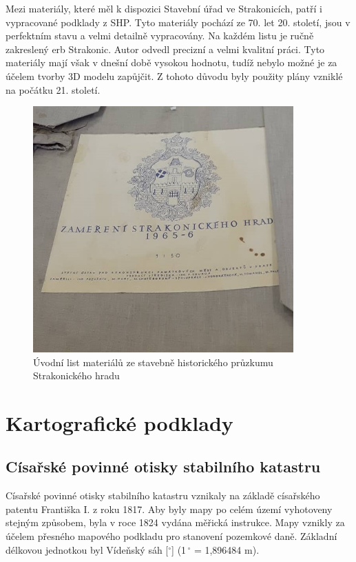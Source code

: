 \documentclass[thesis=M,czech]{FITthesis}[2012/06/26]
\begin{document}
Mezi materiály, které měl k dispozici Stavební úřad ve Strakonicích, patří i vypracované podklady z SHP. Tyto materiály pochází ze 70. let 20. století, jsou v perfektním stavu a velmi detailně vypracovány. Na každém listu je ručně zakreslený erb Strakonic. Autor odvedl precizní a velmi kvalitní práci. Tyto materiály mají však v dnešní době vysokou hodnotu, tudíž nebylo možné je za účelem tvorby 3D modelu zapůjčit. Z tohoto důvodu byly použity plány vzniklé na počátku 21. století. \cite{shp}

\clearpage

\begin{figure}[h!]
	\centering
	\includegraphics[width=10cm]{pics/shp.jpg}
	\caption{Úvodní list materiálů ze stavebně historického průzkumu Strakonického hradu}
	\label{obrazek:shp}
\end{figure}


\section{Kartografické podklady}
\subsection{Císařské povinné otisky stabilního katastru}
Císařské povinné otisky stabilního katastru vznikaly na základě císařského patentu Františka I. z roku 1817. Aby byly mapy po celém území vyhotoveny stejným způsobem, byla v roce 1824 vydána měřická instrukce. Mapy vznikly za účelem přesného mapového podkladu pro stanovení pozemkové daně. Základní délkovou jednotkou byl Vídeňský sáh [$^\circ$] (1\,$^\circ$ = 1,896484 m).
\end{document}
